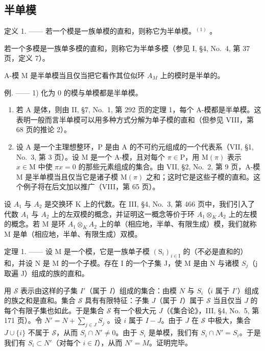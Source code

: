 \subsection{半单模}

定义 1. —— 若一个模是一族单模的直和，则称它为半单模。\(^{(1)}\) 。

若一个多模是一族单多模的直和，则称它为半单多模（参见 I, §4, No.~4, 第 37 页，定义 7）。

A-模 M 是半单模当且仅当把它看作其位似环 \(A_{M}\) 上的模时是半单的。

例. —— 1) 化为 0 的模与单模都是半单模。

\begin{enumerate}
\def\labelenumi{\arabic{enumi})}
\setcounter{enumi}{1}
\item
  若 A 是体，则由 II, §7, No.~1, 第 292 页的定理 1，每个 A-模都是半单模。这表明一般而言半单模可以用多种方式分解为单子模的直和（但参见 VIII，第 68 页的推论 2）。
\item
  设 A 是一个主理想整环，P 是由 A 的不可约元组成的一个代表系（VII, §1, No.~3, 第 3 页）。设 M 是一个 A-模，且对每个 \(\pi \in \mathrm{P}\)，用 \(\mathrm{M}(\pi)\) 表示 \(x \in \mathrm{M}\) 中使 \(\pi x = 0\) 的那些元素组成的集合。由 VII, §2, No.~2, 第 9 页，A-模 M 是半单模当且仅当它是诸子模 \(\mathrm{M}(\pi)\) 之和；这时它是这些子模的直和。这个例子将在后文加以推广（VIII，第 65 页）。
\end{enumerate}

设 \(A_{1}\) 与 \(A_{2}\) 是交换环 K 上的代数。在 III, §4, No.~3, 第 466 页中，我们引入了代数 \(A_{1}\) 与 \(A_{2}\) 上的左双模的概念，并证明这一概念等价于环 \(A_{1} \otimes_{K} A_{2}\) 上的左模的概念。若 M 是环 \(A_{1} \otimes_{K} A_{2}\) 上的单（相应地，半单、有限生成）模，我们就称 M 是单（相应地，半单、有限生成）双模。

定理 1. —— 设 M 是一个模，它是一族单子模 \((\mathrm{S}_{i})_{i\in\mathrm{I}}\) 的（不必是直和的）和，并设 N 是 M 的一个子模。存在 I 的一个子集 J，使 M 是由 N 与诸模 \(S_{j}\)（j 取遍 J）组成的族的直和。

用 \(\mathcal{S}\) 表示由这样的子集 \(I'\)（属于 \(I\)）组成的集合：由模 \(N\) 与 \(S_i\)（\(i\) 属于 \(I'\)）组成的族之和是直和。集合 \(\mathcal{S}\) 具有有限特征：子集 \(J\)（属于 \(I\)）属于 \(\mathcal{S}\) 当且仅当 \(J\) 的每个有限子集也如此。于是集合 \(\mathcal{S}\) 有一个极大元 \(J\)（《集合论》，III, §4, No.~5, 第 171 页）。令 \(N' = N + \sum_{j \in J} S_j\) 。设 \(i\) 属于 \(I - J\)。由于 \(J\) 在 \(\mathcal{S}\) 中极大，集合 \(J \cup \{i\}\) 不属于 \(\mathcal{S}\)，从而 \(S_i \cap N' \neq 0\)。由于 \(S_i\) 是单模，我们有 \(S_i \cap N' = S_i\)。于是我们有 \(S_i \subset N'\)（对每个 \(i \in I\)），从而 \(N' = M\)。证明完毕。

